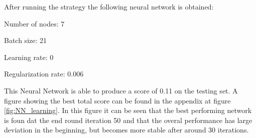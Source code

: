 \newpage
After running the strategy the following neural network is obtained:
\begin{description}
	\item Number of nodes: 7  
	\item Batch size: 21
	\item Learning rate: 0
	\item Regularization rate: 0.006
\end{description}
This Neural Network is able to produce a score of 0.11 on the testing set. A figure showing the best total score can be found in the appendix at figure \ref{fig:NN_learning}. In this figure it can be seen that the best performing network is foun dat the end round iteration 50 and that the overal performance has large deviation in the beginning, but becomes more stable after around 30 iterations.
